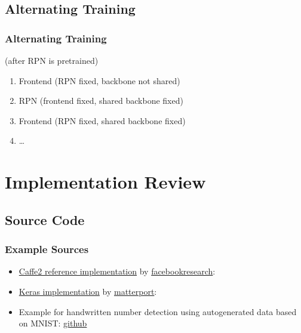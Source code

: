 \subsection{Alternating Training}
\begin{frame}[<+->]
  \frametitle<presentation>{Alternating Training}
  (after RPN is pretrained)
  \begin{enumerate}
  \item Frontend (RPN fixed, backbone not shared)
  \item RPN (frontend fixed, shared backbone fixed)
  \item Frontend (RPN fixed, shared backbone fixed)
  \item \dots~
  \end{enumerate}
\end{frame}

\section{Implementation Review}
\subsection{Source Code}
\begin{frame}
  \frametitle{Example Sources}
  \begin{itemize}
  \item \href{https://github.com/facebookresearch/Detectron}
    {Caffe2 reference implementation} by
    \href{https://github.com/facebookresearch/Detectron}{facebookresearch}:
    \cite{maskrcnncaffe}
  \item
    \href{https://github.com/matterport/Mask_RCNN/blob/master/samples/demo.ipynb}
    {Keras implementation} by \href{https://matterport.com/}{matterport}:
    \cite{maskrcnnkeras}
  \item Example for handwritten number detection using
    autogenerated data based on MNIST:
    \href{https://github.com/gesina/simple_mask_rcnn}{github}
  \end{itemize}
\end{frame}

